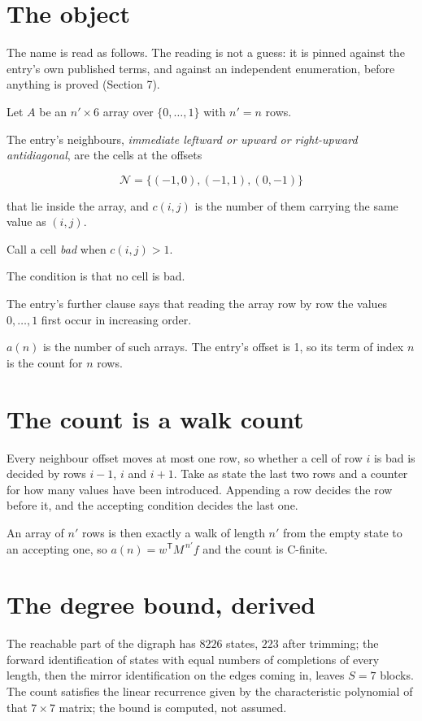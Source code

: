 \documentclass[11pt]{article}
\theoremstyle{definition}
\begin{document}
\section{The object}

The name is read as follows. The reading is not a guess: it is pinned against the entry's own published terms, and against an independent enumeration, before anything is proved (Section 7).

Let $A$ be an $n' \times 6$ array over $\{0,\dots,1\}$ with $n' = n$ rows.

The entry's neighbours, {\itshape immediate leftward or upward or right-upward antidiagonal}, are the cells at the offsets

\[\mathcal{N} = \{(-1,0), (-1,1), (0,-1)\}\]

that lie inside the array, and $c(i,j)$ is the number of them carrying the same value as $(i,j)$.

Call a cell {\itshape bad} when $c(i,j) > 1$.

The condition is that no cell is bad.

The entry's further clause says that reading the array row by row the values $0,\dots,1$ first occur in increasing order.

$a(n)$ is the number of such arrays. The entry's offset is 1, so its term of index $n$ is the count for $n$ rows.

\section{The count is a walk count}

Every neighbour offset moves at most one row, so whether a cell of row $i$ is bad is decided by rows $i-1$, $i$ and $i+1$. Take as state the last two rows and a counter for how many values have been introduced. Appending a row decides the row before it, and the accepting condition decides the last one.

An array of $n'$ rows is then exactly a walk of length $n'$ from the empty state to an accepting one, so $a(n) = w^{\mathsf T}M^{\,n'}f$ and the count is C-finite.

\section{The degree bound, derived}

The reachable part of the digraph has $8226$ states, $223$ after trimming; the forward identification of states with equal numbers of completions of every length, then the mirror identification on the edges coming in, leaves $S = 7$ blocks. The count satisfies the linear recurrence given by the characteristic polynomial of that $7\times7$ matrix; the bound is computed, not assumed.
\end{document}

